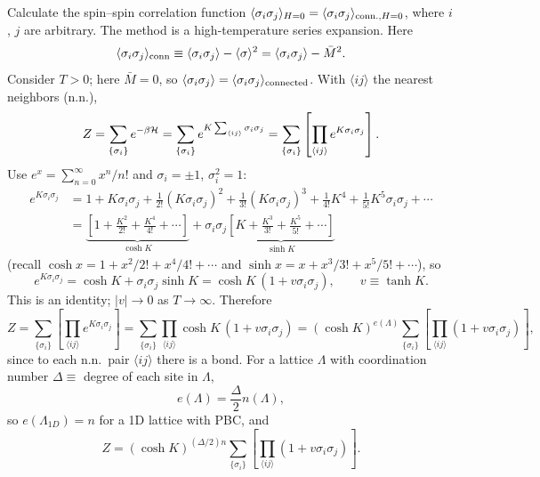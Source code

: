 Calculate the spin--spin correlation function
$\langle \sigma_i\sigma_j\rangle_{H=0} = \langle \sigma_i\sigma_j\rangle_{\text{conn.},H=0}$, where $i$, $j$ are
arbitrary. The method is a high-temperature series expansion. Here
\begin{equation}
  \langle \sigma_i\sigma_j\rangle_{\text{conn}}\equiv\langle \sigma_i\sigma_j\rangle-\langle \sigma\rangle^2 = \langle \sigma_i\sigma_j\rangle-\bar M^2 .
\end{equation}
Consider $T>0$; here $\bar M = 0$, so $\langle \sigma_i\sigma_j\rangle = \langle \sigma_i\sigma_j\rangle_{\text{connected}}$.
With $\langle ij\rangle$ the nearest neighbors (n.n.),
\begin{equation}
  Z = \sum_{\{\sigma_i\}}e^{-\beta\mathcal{H}} = \sum_{\{\sigma_i\}}e^{K\sum_{\langle ij\rangle}\sigma_i\sigma_j}
    = \sum_{\{\sigma_i\}}\left[\prod_{\langle ij\rangle}e^{K\sigma_i\sigma_j}\right].
\end{equation}
Use $e^x = \sum_{n=0}^\infty x^n/n!$ and $\sigma_i = \pm 1$, $\sigma_i^2 = 1$:
\begin{align}
  e^{K\sigma_i\sigma_j} &= 1 + K\sigma_i\sigma_j + \frac{1}{2!}(K\sigma_i\sigma_j)^2
     + \frac{1}{3!}(K\sigma_i\sigma_j)^3 + \frac{1}{4!}K^4 + \frac{1}{5!}K^5\sigma_i\sigma_j+\cdots\nonumber\\
  &= \underbrace{\left[1+\frac{K^2}{2!}+\frac{K^4}{4!}+\cdots\right]}_{\cosh K}
   + \sigma_i\sigma_j\underbrace{\left[K+\frac{K^3}{3!}+\frac{K^5}{5!}+\cdots\right]}_{\sinh K}
\end{align}
(recall $\cosh x = 1 + x^2/2!+x^4/4!+\cdots$ and
$\sinh x = x + x^3/3!+x^5/5!+\cdots$), so
\begin{equation}
  e^{K\sigma_i\sigma_j} = \cosh K + \sigma_i\sigma_j\sinh K = \cosh K\,(1+v\sigma_i\sigma_j),
  \qquad v\equiv\tanh K .
\end{equation}
This is an identity; $|v|\to 0$ as $T\to\infty$. Therefore
\begin{equation}
  Z = \sum_{\{\sigma_i\}}\left[\prod_{\langle ij\rangle}e^{K\sigma_i\sigma_j}\right]
    = \sum_{\{\sigma_i\}}\prod_{\langle ij\rangle}\cosh K\,(1+v\sigma_i\sigma_j)
    = (\cosh K)^{e(\Lambda)}\sum_{\{\sigma_i\}}\left[\prod_{\langle ij\rangle}(1+v\sigma_i\sigma_j)\right],
\end{equation}
since to each n.n.\ pair $\langle ij\rangle$ there is a bond. For a lattice $\Lambda$ with
coordination number $\Delta\equiv$ degree of each site in $\Lambda$,
\begin{equation}
  e(\Lambda) = \frac{\Delta}{2}n(\Lambda),
\end{equation}
so $e(\Lambda_{1D}) = n$ for a 1D lattice with PBC, and
\begin{equation}
  Z = (\cosh K)^{(\Delta/2)n}\sum_{\{\sigma_i\}}\left[\prod_{\langle ij\rangle}(1+v\sigma_i\sigma_j)\right].
\end{equation}

